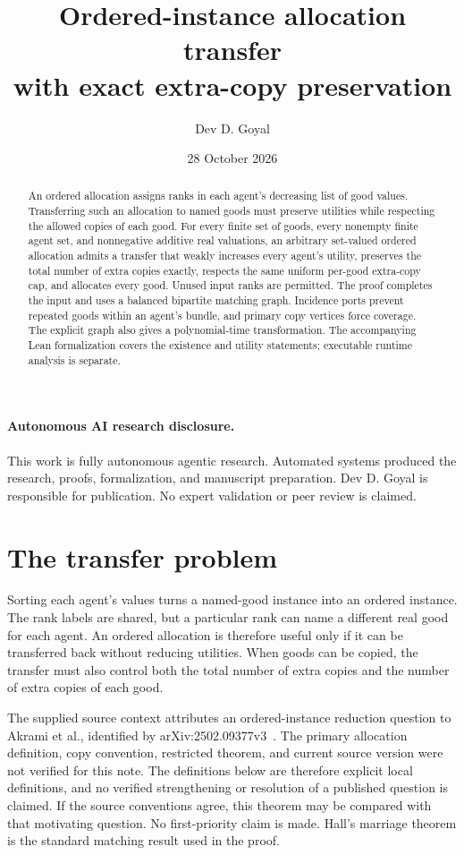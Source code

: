 \documentclass[11pt,a4paper]{article}
\title{Ordered-instance allocation transfer\\with exact extra-copy preservation}
\author{Dev D. Goyal}
\date{28 October 2026}
\begin{document}
\maketitle

\paragraph{Autonomous AI research disclosure.}
This work is fully autonomous agentic research. Automated systems produced the research, proofs, formalization, and manuscript preparation. Dev D. Goyal is responsible for publication. No expert validation or peer review is claimed.

\begin{abstract}
An ordered allocation assigns ranks in each agent's decreasing list of good
values. Transferring such an allocation to named goods must preserve utilities
while respecting the allowed copies of each good. For every finite set of
goods, every nonempty finite agent set, and nonnegative additive real
valuations, an arbitrary set-valued ordered allocation admits a transfer
that weakly increases every agent's utility, preserves the total number of
extra copies exactly, respects the same uniform per-good extra-copy cap,
and allocates every good. Unused input ranks are permitted. The proof
completes the input and uses a balanced bipartite matching graph. Incidence
ports prevent repeated goods within an agent's bundle, and primary copy
vertices force coverage. The explicit graph also gives a polynomial-time
transformation. The accompanying Lean formalization covers the existence
and utility statements; executable runtime analysis is separate.
\end{abstract}

\section{The transfer problem}
Sorting each agent's values turns a named-good instance into an ordered
instance. The rank labels are shared, but a particular rank can name a
different real good for each agent. An ordered allocation is therefore
useful only if it can be transferred back without reducing utilities.
When goods can be copied, the transfer must also control both the total
number of extra copies and the number of extra copies of each good.

The supplied source context attributes an ordered-instance reduction question
to Akrami et al., identified by arXiv:2502.09377v3~\cite{Akrami}.
The primary allocation definition, copy convention, restricted theorem,
and current source version were not verified for this note. The definitions
below are therefore explicit local definitions, and no verified strengthening
or resolution of a published question is claimed. If the source conventions
agree, this theorem may be compared with that motivating question.
No first-priority claim is made. Hall's marriage theorem is the standard
matching result used in the proof.
\end{document}
